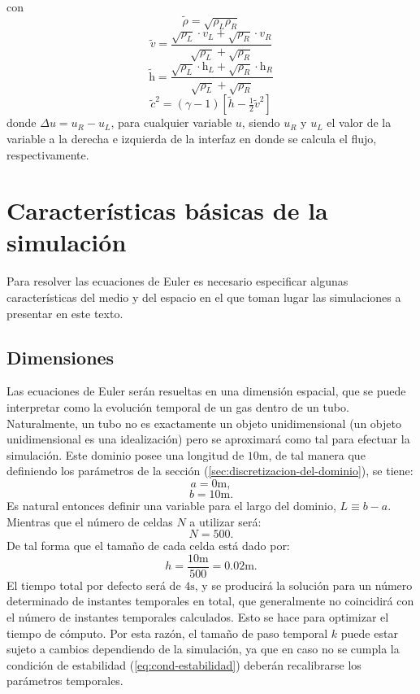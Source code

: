 con
\begin{equation}
	\tilde{\rho} = \sqrt{\rho_L \rho_R}
\end{equation}
\begin{equation}
	\tilde{v} = \frac{\sqrt{\rho_{L}}\cdot v_L + \sqrt{\rho_{R}}\cdot v_R}{\sqrt{\rho_{L}} + \sqrt{\rho_{R}}}
\end{equation}
\begin{equation}
	\tilde{\mathrm{h}} = \frac{\sqrt{\rho_{L}}\cdot \mathrm{h}_L + \sqrt{\rho_{R}}\cdot \mathrm{h}_R}{\sqrt{\rho_{L}} + \sqrt{\rho_{R}}}
\end{equation}
\begin{equation}
	\tilde{c}^{2} = (\gamma - 1)[\tilde{h} - \tfrac{1}{2}\tilde{v}^2]
\end{equation}
donde $\Delta u = u_R - u_L$, para cualquier variable $u$, siendo $u_R$ y $u_L$ el valor de la variable a la derecha e izquierda de la interfaz en donde se calcula el flujo, respectivamente.
\section{Características básicas de la simulación}
Para resolver las ecuaciones de Euler es necesario especificar algunas características del medio y  del espacio en el que toman lugar las simulaciones a presentar en este texto. 
\subsection{Dimensiones}
Las ecuaciones de Euler serán resueltas en una dimensión espacial, que se puede interpretar como la evolución temporal de un gas dentro de un tubo. Naturalmente, un tubo no es exactamente un objeto unidimensional (un objeto unidimensional es una idealización) pero se aproximará como tal para efectuar la simulación. Este dominio posee una longitud de $10\unit{\meter}$, de tal manera que definiendo los parámetros de la sección (\ref{sec:discretizacion-del-dominio}), se tiene:
\begin{equation}
	a = 0 \unit{\meter},
\end{equation}
\begin{equation}
	b = 10 \unit{\meter}.
\end{equation}
Es natural entonces definir una variable para el largo del dominio, $L\equiv b-a$. Mientras que el número de celdas $N$ a utilizar será:
\begin{equation}
	N = 500.
\end{equation}
De tal forma que el tamaño de cada celda está dado por:
\begin{equation}
	h = \frac{10\unit{\meter}}{500} = 0.02 \unit{\meter}.
\end{equation}
El tiempo total por defecto será de $4\unit{\second}$, y se producirá la solución para un número determinado de instantes temporales en total, que generalmente no coincidirá con el número de instantes temporales calculados. Esto se hace para optimizar el tiempo de cómputo. Por esta razón, el tamaño de paso temporal $k$ puede estar sujeto a cambios dependiendo de la simulación, ya que en caso no se cumpla la condición de estabilidad (\ref{eq:cond-estabilidad}) deberán recalibrarse los parámetros temporales.

